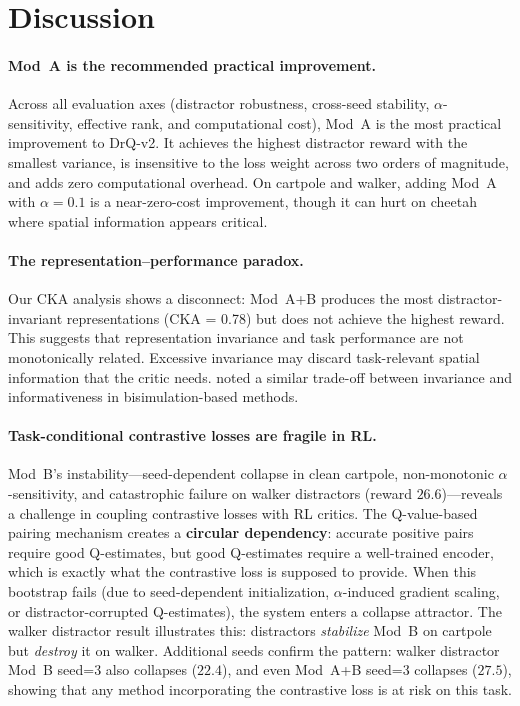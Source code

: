 \documentclass{article}
\begin{document}
\section{Discussion}
\label{sec:discussion}

\paragraph{Mod~A is the recommended practical improvement.}
Across all evaluation axes (distractor robustness, cross-seed stability, $\alpha$-sensitivity, effective rank, and computational cost), Mod~A is the most practical improvement to DrQ-v2.
It achieves the highest distractor reward with the smallest variance, is insensitive to the loss weight across two orders of magnitude, and adds zero computational overhead.
On cartpole and walker, adding Mod~A with $\alpha=0.1$ is a near-zero-cost improvement, though it can hurt on cheetah where spatial information appears critical.

\paragraph{The representation--performance paradox.}
Our CKA analysis shows a disconnect: Mod~A+B produces the most distractor-invariant representations (CKA = 0.78) but does not achieve the highest reward.
This suggests that representation invariance and task performance are not monotonically related.
Excessive invariance may discard task-relevant spatial information that the critic needs.
\citet{zhang2021learning} noted a similar trade-off between invariance and informativeness in bisimulation-based methods.

\paragraph{Task-conditional contrastive losses are fragile in RL.}
Mod~B's instability---seed-dependent collapse in clean cartpole, non-monotonic $\alpha$-sensitivity, and catastrophic failure on walker distractors (reward $26.6$)---reveals a challenge in coupling contrastive losses with RL critics.
The Q-value-based pairing mechanism creates a \textbf{circular dependency}: accurate positive pairs require good Q-estimates, but good Q-estimates require a well-trained encoder, which is exactly what the contrastive loss is supposed to provide.
When this bootstrap fails (due to seed-dependent initialization, $\alpha$-induced gradient scaling, or distractor-corrupted Q-estimates), the system enters a collapse attractor.
The walker distractor result illustrates this: distractors \emph{stabilize} Mod~B on cartpole but \emph{destroy} it on walker.
Additional seeds confirm the pattern: walker distractor Mod~B seed=3 also collapses ($22.4$), and even Mod~A+B seed=3 collapses ($27.5$), showing that any method incorporating the contrastive loss is at risk on this task.
\end{document}
